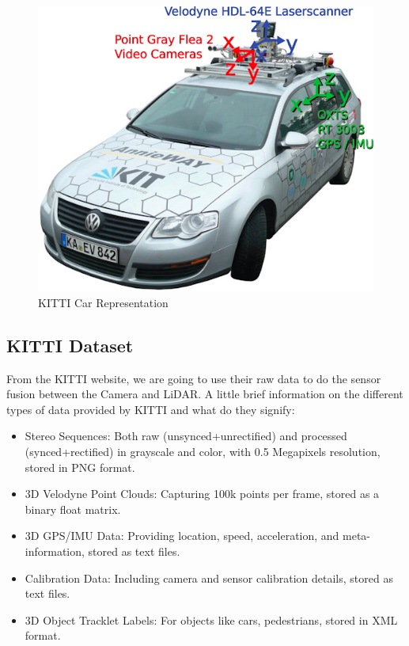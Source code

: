 \documentclass[letterpaper, 10 pt, conference]{ieeeconf}  %
\begin{document}
\begin{figure}[htbp]
  \centering
  \includegraphics[width=\linewidth]{KITTI_car.png}
  \caption{KITTI Car Representation}
  \label{KITTI Ego Vehile}
\end{figure}

\subsection{KITTI Dataset}

From the KITTI website\cite{KITTIWebsite}, we are going to use their raw data to do the sensor fusion between the Camera and LiDAR.
A little brief information on the different types of data provided by KITTI and what do they signify:

\begin{itemize}
  \item Stereo Sequences: Both raw (unsynced+unrectified) and processed (synced+rectified) in grayscale and color, with 0.5 Megapixels resolution, stored in PNG format.
  \item 3D Velodyne Point Clouds: Capturing 100k points per frame, stored as a binary float matrix.
  \item 3D GPS/IMU Data: Providing location, speed, acceleration, and meta-information, stored as text files.
  \item Calibration Data: Including camera and sensor calibration details, stored as text files.
  \item 3D Object Tracklet Labels: For objects like cars, pedestrians, stored in XML format.
\end{itemize}
\end{document}
